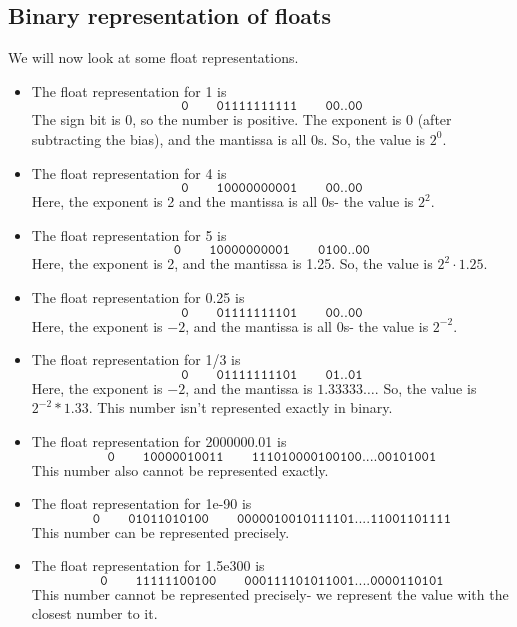 \documentclass[a4paper, openany]{memoir}
\begin{document}
    \subsection{Binary representation of floats}
    We will now look at some float representations.
    \begin{itemize}
        \item The float representation for 1 is
        \[\texttt{0} \qquad \texttt{01111111111} \qquad \texttt{00..00}\]
        The sign bit is 0, so the number is positive. The exponent is 0 (after subtracting the bias), and the mantissa is all 0s. So, the value is $2^0$.

        \item The float representation for 4 is
        \[\texttt{0} \qquad \texttt{10000000001} \qquad \texttt{00..00}\]
        Here, the exponent is 2 and the mantissa is all 0s- the value is $2^2$.
        
        \item The float representation for 5 is
        \[\texttt{0} \qquad \texttt{10000000001} \qquad \texttt{0100..00}\]
        Here, the exponent is 2, and the mantissa is 1.25. So, the value is $2^2 \cdot 1.25$.

        \item The float representation for 0.25 is
        \[\texttt{0} \qquad \texttt{01111111101} \qquad \texttt{00..00}\]
        Here, the exponent is $-2$, and the mantissa is all 0s- the value is $2^{-2}$.

        \item The float representation for 1/3 is
        \[\texttt{0} \qquad \texttt{01111111101} \qquad \texttt{01..01}\]
        Here, the exponent is $-2$, and the mantissa is $1.33333\dots$. So, the value is $2^{-2} * 1.33$. This number isn't represented exactly in binary.

        \item The float representation for 2000000.01 is
        \[\texttt{0} \qquad \texttt{10000010011} \qquad \texttt{111010000100100....00101001}\]
        This number also cannot be represented exactly.

        \item The float representation for 1e-90 is
        \[\texttt{0} \qquad \texttt{01011010100} \qquad \texttt{0000010010111101....11001101111}\]
        This number can be represented precisely.

        \item The float representation for 1.5e300 is
        \[\texttt{0} \qquad \texttt{11111100100} \qquad \texttt{000111101011001....0000110101}\]        This number cannot be represented precisely- we represent the value with the closest number to it.
    \end{itemize}
\end{document}
